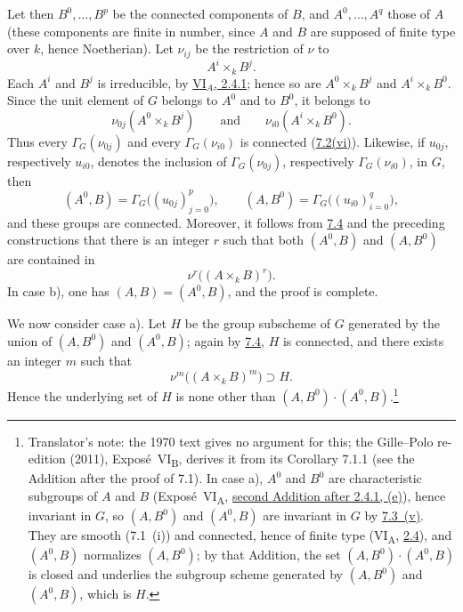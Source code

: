 Let then \(B^0,\ldots,B^p\) be the connected components of
\(B\), and \(A^0,\ldots,A^q\) those of \(A\) (these components
are finite in number, since \(A\) and \(B\) are supposed of
finite type over \(k\), hence Noetherian). Let
\(\nu_{ij}\) be the restriction of \(\nu\) to
\[
  A^i\times_kB^j.
\]
Each \(A^i\) and \(B^j\) is irreducible, by
\hyperref[cor:sga3-VIA-2.4.1]{VI\(_A\), 2.4.1}; hence so are
\(A^0\times_kB^j\) and \(A^i\times_kB^0\). Since the unit
element of \(G\) belongs to \(A^0\) and to \(B^0\), it belongs
to
\[
  \nu_{0j}(A^0\times_kB^j)
  \qquad\text{and}\qquad
  \nu_{i0}(A^i\times_kB^0).
\]
Thus every \(\Gamma_G(\nu_{0j})\) and every
\(\Gamma_G(\nu_{i0})\) is connected
(\hyperref[rem:sga3-VIB-7.2-vi]{7.2\textup{(vi)}}). Likewise, if
\(u_{0j}\), respectively \(u_{i0}\), denotes the inclusion
of \(\Gamma_G(\nu_{0j})\), respectively
\(\Gamma_G(\nu_{i0})\), in \(G\), then
\label{form:sga3-VIB-7.8-generated-connected-groups}%
\[
  (A^0,B)=\Gamma_G\bigl((u_{0j})_{j=0}^{p}\bigr),
  \qquad
  (A,B^0)=\Gamma_G\bigl((u_{i0})_{i=0}^{q}\bigr),
\]
and these groups are connected. Moreover, it follows from
\hyperref[prop:sga3-VIB-7.4]{7.4} and the preceding
constructions that there is an integer \(r\) such that both
\((A^0,B)\) and \((A,B^0)\) are contained in
\[
  \nu^r\bigl((A\times_kB)^r\bigr).
\]
In case \textup{b)}, one has \((A,B)=(A^0,B)\), and the proof
is complete.

We now consider case \textup{a)}. Let \(H\) be the group
subscheme of \(G\) generated by the union of \((A,B^0)\) and
\((A^0,B)\); again by \hyperref[prop:sga3-VIB-7.4]{7.4}, \(H\)
is connected, and there exists an integer \(m\) such that
\label{form:sga3-VIB-7.8-H-contained}%
\[
  \nu^m\bigl((A\times_kB)^m\bigr)\supset H.
\]
Hence the underlying set of \(H\) is none other than
\((A,B^0)\cdot(A^0,B)\).\footnote{Translator's note: the 1970 text gives no argument for this; the Gille--Polo
re-edition (2011), Exposé~VI\textsubscript{B}, derives it from its Corollary 7.1.1 (see the Addition after the
proof of 7.1). In case a), \(A^0\) and \(B^0\) are characteristic subgroups of \(A\) and \(B\)
(Exposé~VI\textsubscript{A}, \hyperref[thm:sga3-VIA-2.6.5]{second Addition after 2.4.1, (e)}), hence invariant in
\(G\), so \((A,B^0)\) and \((A^0,B)\) are invariant in \(G\) by
\hyperref[concl:sga3-VIB-7.3-v]{7.3~(v)}. They are smooth (7.1~(i)) and connected, hence of finite type
(VI\textsubscript{A}, \hyperref[prop:sga3-VIA-2.4]{2.4}), and \((A^0,B)\) normalizes \((A,B^0)\); by that
Addition, the set \((A,B^0)\cdot(A^0,B)\) is closed and underlies the subgroup scheme generated by
\((A,B^0)\) and \((A^0,B)\), which is \(H\).}

